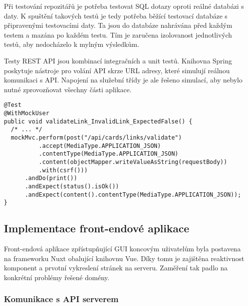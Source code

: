 		Při testování repozitářů je potřeba testovat \ac{SQL} dotazy oproti reálné databázi s daty.
		K spuštění takových testů je tedy potřeba běžící testovací databáze s připravenými testovacími daty.
		Ta jsou do databáze nahrávána před každým testem a mazána po každém testu.
		Tím je zaručena izolovanost jednotlivých testů, aby nedocházelo k mylným výsledkům.

		Testy \ac{REST} \ac{API} jsou kombinací integračních a unit testů.
		Knihovna Spring poskytuje nástroje pro volání \ac{API} skrze \ac{URL} adresy, které simulují reálnou komunikaci
		s \ac{API}.
		Napojení na služební třídy je ale řešeno simulací, aby nebylo nutné zprovozňovat všechny části
		aplikace.

		\begin{codeblock}
			\begin{verbatim}
@Test
@WithMockUser
public void validateLink_InvalidLink_ExpectedFalse() {
  /* ... */
  mockMvc.perform(post("/api/cards/links/validate")
          .accept(MediaType.APPLICATION_JSON)
          .contentType(MediaType.APPLICATION_JSON)
          .content(objectMapper.writeValueAsString(requestBody))
          .with(csrf()))
      .andDo(print())
      .andExpect(status().isOk())
      .andExpect(content().contentType(MediaType.APPLICATION_JSON));
}
			\end{verbatim}
		\end{codeblock}

	\subsection{Implementace front-endové aplikace}

	Front-endová aplikace zpřístupňující \ac{GUI} koncovým uživatelům byla postavena na frameworku
	Nuxt obalující knihovnu Vue.
	Díky tomu je zajištěna reaktivnost komponent a prvotní vykreslení stránek na serveru.
	Zaměření tak padlo na konkrétní problémy řešené domény.

		\subsubsection{Komunikace s API serverem}

